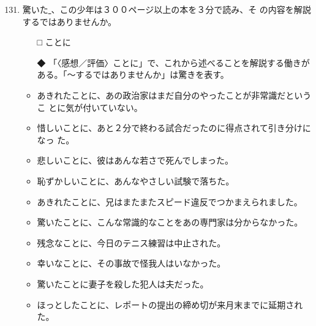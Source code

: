 \documentclass[
uplatex,
b5paper,
10pt,
dvipdfmx
]{jsbook}
\begin{document}
\begin{enumerate}
\setcounter{enumi}{130}

\item 驚いた\underline{   }、この少年は３００ページ以上の本を３分で読み、そ
       の内容を解説するではありませんか。
\begin{itemize}
\item[□] ことに
\item[◆] 「〈感想／評価〉ことに」で、これから述べることを解説する働きが
	  ある。「〜するではありませんか」は驚きを表す。
\end{itemize}
\begin{itemize}
\item あきれたことに、あの政治家はまだ自分のやったことが非常識だというこ
      とに気が付いていない。
\item 惜しいことに、あと２分で終わる試合だったのに得点されて引き分けになっ
      た。
\item 悲しいことに、彼はあんな若さで死んでしまった。
\item 恥ずかしいことに、あんなやさしい試験で落ちた。
\item あきれたことに、兄はまたまたスピード違反でつかまえられました。
\item 驚いたことに、こんな常識的なことをあの専門家は分からなかった。
\item 残念なことに、今日のテニス練習は中止された。
\item 幸いなことに、その事故で怪我人はいなかった。
\item 驚いたことに妻子を殺した犯人は夫だった。
\item ほっとしたことに、レポートの提出の締め切が来月末までに延期された。
\end{itemize}


\end{enumerate}
\end{document}
